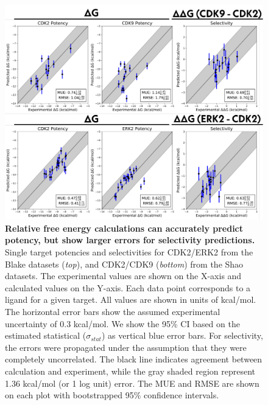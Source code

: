 \documentclass[9pt,lineno]{elife-modified} %
\begin{document}
\begin{figure}
\begin{fullwidth}
\begin{centering}
\includegraphics[width=1.0\linewidth]{figures/figure4.pdf}
\end{centering}
\caption{
\label{fig:figure-4}
{\bf Relative free energy calculations can accurately predict potency, but show larger errors for selectivity predictions.} \\
Single target potencies and selectivities for CDK2/ERK2 from the Blake datasets (\emph{top}), and CDK2/CDK9 (\emph{bottom}) from the Shao datasets. The experimental values are shown on the X-axis and calculated values on the Y-axis. Each data point corresponds to a ligand for a given target. All values are shown in units of kcal/mol. The horizontal error bars show the assumed experimental uncertainty of 0.3 kcal/mol\citep{BROWN2009420}. We show the 95\% CI based on the estimated statistical ($\sigma_{stat}$) as vertical blue error bars. For selectivity, the errors were propagated under the assumption that they were completely uncorrelated. The black line indicates agreement between calculation and experiment, while the gray shaded region represent 1.36 kcal/mol (or 1 log unit) error. The MUE and RMSE are shown on each plot with bootstrapped 95$\%$ confidence intervals.
}

\end{fullwidth}
\end{figure}
\end{document}
